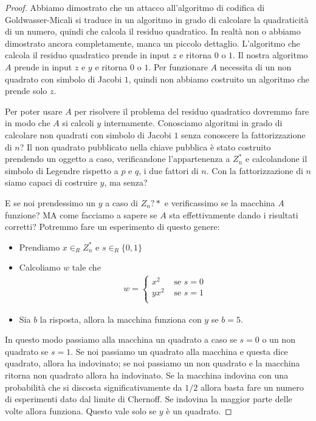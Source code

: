 \begin{proof}
\noindent Abbiamo dimostrato che un attacco all'algoritmo di codifica di Goldwasser-Micali si traduce in un algoritmo in grado di calcolare la quadraticità di un numero, quindi che calcola il residuo quadratico. In realtà non o abbiamo dimostrato ancora completamente, manca un piccolo dettaglio. L'algoritmo che calcola il residuo quadratico prende in input $z$ e ritorna $0$ o $1$. Il nostra algoritmo $A$ prende in input $z$ e $y$ e ritorna $0$ o $1$. Per funzionare $A$ necessita di un non quadrato con simbolo di Jacobi $1$, quindi non abbiamo costruito un algoritmo che prende solo $z$. 

Per poter usare $A$ per risolvere il problema del residuo quadratico dovremmo fare in modo che $A$ si calcoli $y$ internamente. Conosciamo algoritmi in grado di calcolare non quadrati con simbolo di Jacobi $1$ senza conoscere la fattorizzazione di $n$? Il non quadrato pubblicato nella chiave pubblica è stato costruito prendendo un oggetto a caso, verificandone l'appartenenza a $Z_n^*$ e calcolandone il simbolo di Legendre rispetto a $p$ e $q$, i due fattori di $n$. Con la fattorizzazione di $n$ siamo capaci di costruire $y$, ma senza?

E se noi prendessimo un $y$ a caso di $Z_n?*$ e verificassimo se la macchina $A$ funzione? MA come facciamo a sapere se $A$ sta effettivamente dando i risultati corretti? Potremmo fare un esperimento di questo genere:
\begin{itemize}
    \item Prendiamo $x \in_R Z_n^*$ e $s \in_R \{0, 1\}$
    \item Calcoliamo $w$ tale che 
    \begin{align*}
        w = \begin{cases}
                x^2 & \text{ se } s=0\\
                yx^2 & \text{ se } s=1\\
        \end{cases}
    \end{align*}
    \item Sia $b$ la risposta, allora la macchina funziona con $y$ se $b=5$.
\end{itemize}

\noindent In questo modo passiamo alla macchina un quadrato a caso se $s = 0$ o un non quadrato se $s=1$. Se noi passiamo un quadrato alla macchina e questa dice quadrato, allora ha indovinato; se noi passiamo un non quadrato e la macchina ritorna non quadrato allora ha indovinato. Se la macchina indovina con una probabilità che si discosta significativamente da $1/2$ allora basta fare un numero di esperimenti dato dal limite di Chernoff. Se indovina la maggior parte delle volte allora funziona. Questo vale solo se $y$ è un quadrato.


\end{proof}
